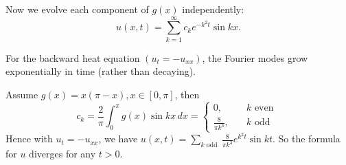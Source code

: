 Now we evolve each component of $g(x)$ independently: 
\[
    u(x,t) = \sum_{k=1}^{\infty} c_k e^{-k^2t} \sin kx.  
\]


\begin{note}
For the backward heat equation $ (u_t = -u_{xx}) $, the Fourier modes grow exponentially in time (rather than decaying).  
\end{note}


\begin{example}
\label{eg: he}
Assume $g(x) = x(\pi-x), x\in[0,\pi]$, then 
\[
    c_k = \frac{2}{\pi } \int_{0}^{\pi } g(x) \sin kx \, dx = 
    \begin{cases}
        0, \quad &k \text{ even }\\ 
        \frac{8}{\pi k^3}, \quad &k \text{ odd }
    \end{cases} 
\]
Hence with $u_t = -u_{xx}$, we have $ u(x,t) = \sum_{k \text{ odd }} \frac{8}{\pi k^3} e^{k^2 t} \sin kt   $. So the formula for $u$ diverges for any $t>0$. 
\end{example}
